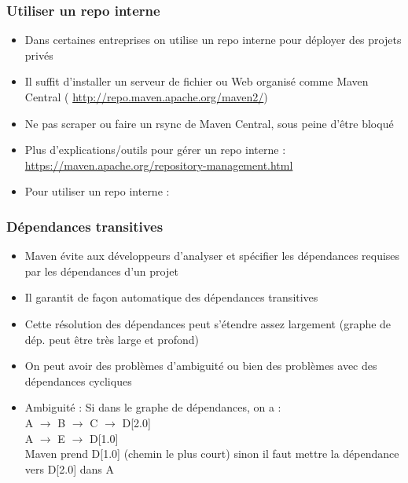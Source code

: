 \documentclass{beamer}
\begin{document}
\begin{frame}[fragile]
  \frametitle{Utiliser un repo interne}
  \begin{itemize}
  \item Dans certaines entreprises on utilise un repo interne pour
    déployer des projets privés 
    
  \item Il suffit d'installer un serveur de fichier ou Web organisé
    comme Maven Central ({\footnotesize
      \url{http://repo.maven.apache.org/maven2/}})
  \item Ne pas scraper ou faire un rsync de Maven Central, sous peine
    d'être bloqué
    \item Plus d'explications/outils pour gérer un repo interne :\\ {\footnotesize\url{https://maven.apache.org/repository-management.html}}
      \vspace{1cm}
    \item Pour utiliser un repo interne :
      \vspace{2cm}      
  \end{itemize}
\end{frame}

\begin{frame}[fragile]
  \frametitle{Dépendances transitives}
  \begin{itemize}
  \item Maven évite aux développeurs d'analyser et spécifier les
    dépendances requises par les dépendances d'un projet
  \item Il garantit de façon automatique des dépendances transitives
  \item Cette résolution des dépendances peut s'étendre assez
    largement (graphe de dép. peut être très large et profond)
  \item On peut avoir des problèmes d'ambiguité ou bien des problèmes
    avec des dépendances cycliques
  \item Ambiguité : Si dans le graphe de dépendances, on a :\\
    A $\rightarrow$ B $\rightarrow$ C $\rightarrow$ D[2.0]\\
    A $\rightarrow$ E $\rightarrow$ D[1.0]\\
    Maven prend D[1.0] (chemin le plus court) sinon il faut mettre la
    dépendance vers D[2.0] dans A
  \end{itemize}
\end{frame}
\end{document}
